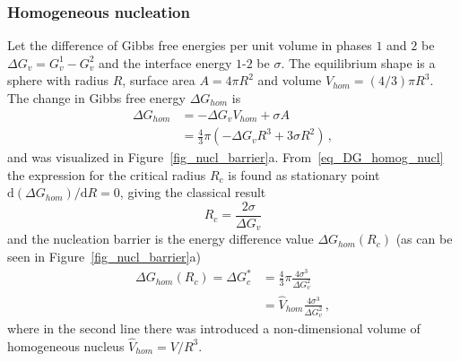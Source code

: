         \subsubsection{Homogeneous nucleation}
        Let the difference of Gibbs free energies per unit volume in phases $\mathit{1}$ and $\mathit{2}$ be $\Delta G_v=G_v^\mathit{1}-G_v^\mathit{2}$ and the interface energy $\mathit{1}$-$\mathit{2}$ be $\sigma$. The equilibrium shape is a sphere with radius $R$, surface area $A=4\pi R^2$ and volume $V_{hom}=(4/3)\pi R^3$. The change in Gibbs free energy $\Delta G_{hom}$ is
        \begin{align}
            \Delta G_{hom} &= -\Delta G_v V_{hom} + \sigma A  \\
                &= \frac{4}{3}\pi(-\Delta G_v R^3 + 3\sigma R^2)\,, \label{eq_DG_homog_nucl}
        \end{align}
        and was visualized in Figure~\ref{fig_nucl_barrier}a. From~\eqref{eq_DG_homog_nucl} the expression for the critical radius $R_c$ is found as stationary point $\mathrm{d}(\Delta G_{hom})/\mathrm{d}R=0$, giving the classical result
        \begin{equation} \label{eq_crit_radius}
            R_c = \frac{2\sigma}{\Delta G_v}
        \end{equation}
        and the nucleation barrier is the energy difference value $\Delta G_{hom}(R_c)$ (as can be seen in Figure~\ref{fig_nucl_barrier}a)
        \begin{align}
            \Delta G_{hom}(R_c) = \Delta G_c^* &= \frac{4}{3}\pi\frac{4\sigma^3}{\Delta G_v^2}    \\
                &= \hat{V}_{hom}\frac{4\sigma^3}{\Delta G_v^2} \,,\label{eq_crit_nucl_barrier_hom_iso}
        \end{align}
        where in the second line there was introduced a non-dimensional volume of homogeneous nucleus $\hat{V}_{hom}=V/R^3$.
        
%            
%            
%                
%                    
%                
%            
        
